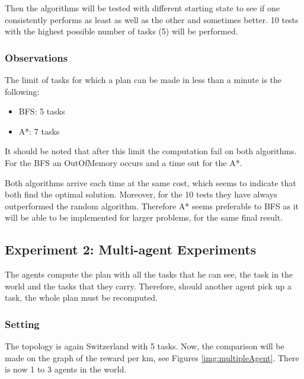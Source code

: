 \documentclass[11pt]{article}
\begin{document}
Then the algorithms will be tested with different starting state to see if one consistently performs as least as well as the other and sometimes better. 10 tests with the highest possible number of tasks (5) will be performed. 
\subsubsection{Observations}
The limit of tasks for which a plan can be made in less than a minute is the following:
\begin{itemize}
  \item BFS: 5 tasks
  \item A*: 7 tasks
\end{itemize}
It should be noted that after this limit the computation fail on both algorithms. For the BFS an OutOfMemory occurs and a time out for the A*.

Both algorithms arrive each time at the same cost, which seems to indicate that both find the optimal solution. Moreover, for the 10 tests they have always outperformed the random algorithm. Therefore A* seems preferable to BFS as it will be able to be implemented for larger problems, for the same final result.

\subsection{Experiment 2: Multi-agent Experiments}
The agents compute the plan with all the tasks that he can see, the task in the world and the tasks that they carry. Therefore, should another agent pick up a task, the whole plan must be recomputed.  
\subsubsection{Setting}
The topology is again Switzerland with 5 tasks. Now, the comparison will be made on the graph of the reward per km, see Figures \ref{img:multipleAgent}. There is now 1 to 3 agents in the world. 
\end{document}
